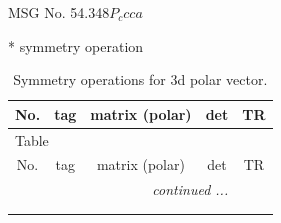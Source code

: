 \documentclass[fleqn,8pt]{jsarticle}
\begin{document}
\setcounter{MaxMatrixCols}{32}

\renewcommand{\tablename}{Table~}
\renewcommand{\figurename}{Figure~}
\begin{center}
\LARGE
MSG No. 54.348\quad$P_{c}cca$
\end{center}
* symmetry operation
\renewcommand{\arraystretch}{1.3}
\begin{longtable}{ccccc}
\caption{Symmetry operations for 3d polar vector.}
 \\
 \hline \hline
No. & tag & matrix (polar) & det & TR \\ \hline \endfirsthead

\multicolumn{4}{l}{\tablename\ \thetable{}} \\
 \hline \hline
No. & tag & matrix (polar) & det & TR \\ \hline \endhead

 \hline \hline
\multicolumn{4}{r}{\footnotesize\it continued ...} \\ \endfoot

 \hline \hline
\multicolumn{4}{r}{} \\ \endlastfoot


\end{longtable}
\end{document}
